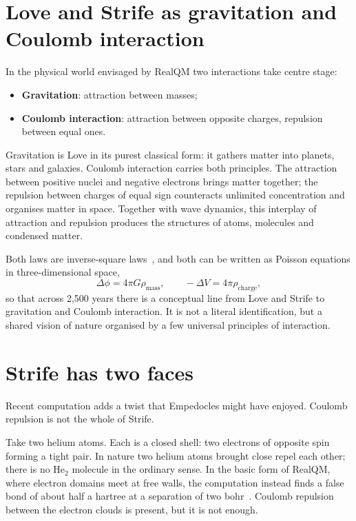 \documentclass[11pt]{article}
\begin{document}
\section{Love and Strife as gravitation and Coulomb interaction}

In the physical world envisaged by RealQM two interactions take centre stage:
\begin{itemize}
\item \textbf{Gravitation}: attraction between masses;
\item \textbf{Coulomb interaction}: attraction between opposite charges, repulsion between equal ones.
\end{itemize}
Gravitation is Love in its purest classical form: it gathers matter into planets, stars and galaxies.
Coulomb interaction carries both principles. The attraction between positive nuclei and negative
electrons brings matter together; the repulsion between charges of equal sign counteracts unlimited
concentration and organises matter in space. Together with wave dynamics, this interplay of attraction
and repulsion produces the structures of atoms, molecules and condensed matter.

Both laws are inverse-square laws~\cite{newton,coulomb}, and both can be written as Poisson equations in three-dimensional
space,
\begin{equation*}
\Delta\phi = 4\pi G\rho_{\mathrm{mass}}, \qquad -\Delta V = 4\pi\rho_{\mathrm{charge}},
\end{equation*}
so that across 2{,}500 years there is a conceptual line from Love and Strife to gravitation and Coulomb
interaction. It is not a literal identification, but a shared vision of nature organised by a few
universal principles of interaction.

\section{Strife has two faces}

Recent computation adds a twist that Empedocles might have enjoyed. Coulomb repulsion is not the whole of
Strife.

Take two helium atoms. Each is a closed shell: two electrons of opposite spin forming a tight pair. In
nature two helium atoms brought close repel each other; there is no He$_2$ molecule in the ordinary
sense. In the basic form of RealQM, where electron domains meet at free walls, the computation instead
finds a false bond of about half a hartree at a separation of two bohr~\cite{rqmol}. Coulomb repulsion between the
electron clouds is present, but it is not enough.
\end{document}
